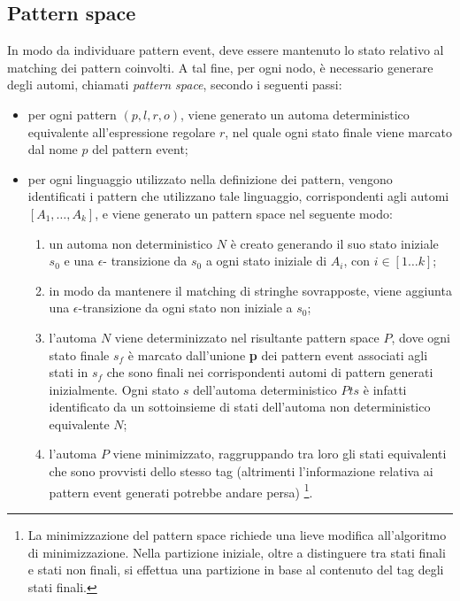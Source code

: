 \subsection{Pattern space}
In modo da individuare pattern event, deve essere mantenuto lo stato relativo al matching dei pattern coinvolti. A tal fine, per ogni nodo, è necessario generare degli automi, chiamati \emph{pattern space}, secondo i seguenti passi:
\begin{itemize}
\item per ogni pattern $(p,l,r,o)$, viene generato un automa deterministico equivalente all'espressione regolare $r$, nel quale ogni stato finale viene marcato dal nome $p$ del pattern event;
\item per ogni linguaggio utilizzato nella definizione dei pattern, vengono identificati i pattern che utilizzano tale linguaggio, corrispondenti agli automi $[A_1, \ldots , A_k]$, e viene generato un pattern space nel seguente modo:
	\begin{enumerate}
	\item un automa non deterministico $N$ è creato generando il suo stato iniziale $s_0$ e una $\epsilon$-			transizione da $s_0$ a ogni stato iniziale di $A_i$, con $i \in [1 \ldots k]$;
	\item in modo da mantenere il matching di stringhe sovrapposte, viene aggiunta una $\epsilon$-transizione	da ogni stato non iniziale a $s_0$;
	\item l'automa $N$ viene determinizzato nel risultante pattern space $P$, dove ogni stato finale $s_f$ è marcato dall'unione \textbf{p} dei pattern event associati agli stati in $s_f$ che sono finali nei corrispondenti automi di pattern generati inizialmente. Ogni stato $s$ dell'automa deterministico $Pts$ è infatti identificato da un sottoinsieme di stati dell'automa non deterministico equivalente $N$;
	\item l'automa $P$ viene minimizzato, raggruppando tra loro gli stati equivalenti che sono provvisti dello stesso tag (altrimenti l'informazione relativa ai pattern event generati potrebbe andare persa) \footnote{La minimizzazione del pattern space richiede una lieve modifica all'algoritmo di minimizzazione. Nella partizione iniziale, oltre a distinguere tra stati finali e stati non finali, si effettua una partizione in base al contenuto del tag degli stati finali.}.
	\end{enumerate}
\end{itemize}


